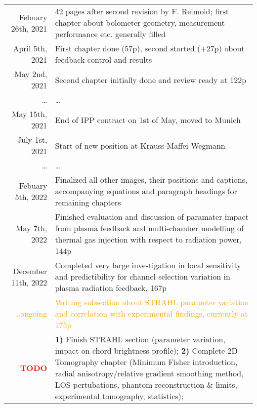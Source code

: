 \documentclass[%
    a4,
    10pt,
    twoside
    ]{%
    scrreprt%
    }
\newcommand{\foo}{%
  \hspace{-2.3pt}$\bullet$ \hspace{5pt}%
}
\begin{document}
\begin{table}[h!]
\begin{tabular}{r |@{\foo} p{}}
      Febuary 26th, 2021 & %
      42 pages after second revision by F. Reimold; first chapter about bolometer geometry, measurement performance etc. generally filled\newline\\%
      April 5th, 2021 & %
      First chapter done (57p), second started (+27p) about feedback control and results\newline\\%
      May 2nd, 2021 & %
      Second chapter initially done and review ready at 122p\newline\\%
      \dots & \dots\newline\\%
      May 15th, 2021 & %
      End of IPP contract on 1st of May, moved to Munich\newline\\%
      July 1st, 2021 & %
      Start of new position at Krauss-Maffei Wegmann\newline\\%
      \dots & \dots\newline\\%
      Febuary 5th, 2022 & %
      Finalized all other images, their positions and captions, accompanying equations and paragraph headings for remaining chapters\newline\\%
      May 7th, 2022 & %
      Finished evaluation and discussion of paramater impact from plasma feedback and multi-chamber modelling of thermal gas injection with respect to radiation power, 144p\newline\\%
      December 11th, 2022 & %
      Completed very large investigation in local sensitivity and predictibility for channel selection variation in plasma radiation feedback, 167p\newline\\%
      \textcolor{orange}{\dots ongoing} & %
      \textcolor{orange}{%
        Writing subsection about STRAHL parameter variation and correlation with experimental findings, currently at 175p}%
      \newline\\%
      \textcolor{red}{\textbf{TODO}} & %
      \textbf{1)} Finish STRAHL section (parameter variation, impact on chord brightness profile);\newline%
      \textbf{2)} Complete 2D Tomography chapter (Minimum Fisher introduction, radial anisotropy/relative gradient smoothing method, LOS pertubations, phantom reconstruction \& limits, experimental tomography, statistics);\newline%

\end{tabular}
\end{table}
\end{document}
